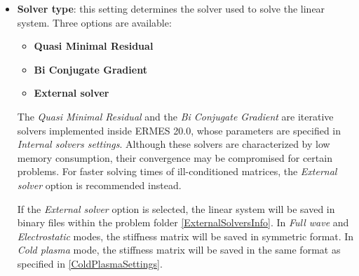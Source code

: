 \begin{itemize}\itemsep0.5em 
	\item \textbf{Solver type}: this setting determines the solver used to solve the linear system. Three options are available:
	\begin{itemize}\itemsep0em 
	    \item \textbf{Quasi Minimal Residual}
	    \item \textbf{Bi Conjugate Gradient}
	    \item \textbf{External solver}
    \end{itemize}
    The \textit{Quasi Minimal Residual} and the \emph{Bi Conjugate Gradient} are iterative solvers implemented inside ERMES 20.0, whose parameters are specified in \emph{Internal solvers settings}. Although these solvers are characterized by low memory consumption, their convergence may be compromised for certain problems. For faster solving times of ill-conditioned matrices, the \emph{External solver} option is recommended instead. 
    
    If the \emph{External solver} option is selected, the linear system will be saved in binary files within the problem folder \ref{ExternalSolversInfo}. In \textit{Full wave} and \textit{Electrostatic} modes, the stiffness matrix will be saved in symmetric format. In \textit{Cold plasma} mode, the stiffness matrix will be saved in the same format as specified in \ref{ColdPlasmaSettings}. 
    

\end{itemize}
